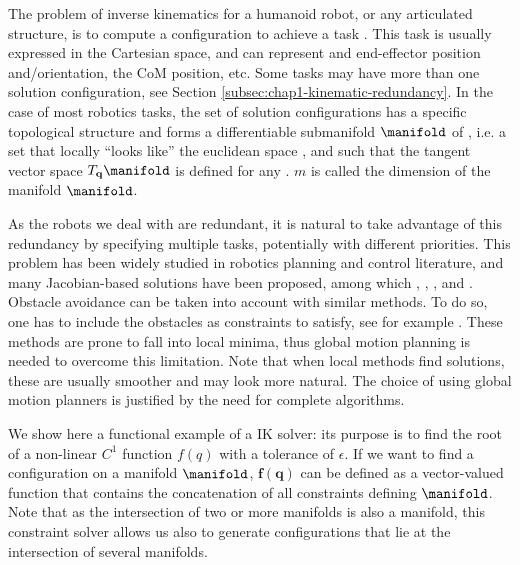 The problem of inverse kinematics for a humanoid robot, or any
articulated structure, is to compute a configuration \config{} to
achieve a task \task{}. This task is usually expressed in the
Cartesian space, and can represent and end-effector position
and/orientation, the CoM position, etc. Some tasks may have more than
one solution configuration, see Section
\ref{subsec:chap1-kinematic-redundancy}. In the case of most robotics
tasks, the set of solution configurations has a specific topological
structure and forms a differentiable submanifold $\manifold$
of \cspace, i.e. a set that locally ``looks like'' the euclidean
space , and such that the tangent vector space
$T_{\mathbf{q}}\manifold$ is defined for any \config{}. $m$ is called the
dimension of the manifold $\manifold$.

As the robots we deal with are redundant, it is natural to take
advantage of this redundancy by specifying multiple tasks, potentially
with different priorities. This problem has been widely studied in
robotics planning and control literature, and many Jacobian-based
solutions have been proposed, among which \cite{nakamura1986iks},
\cite{siciliano1991gfm}, \cite{baerlocher1998tpf},
\cite{khatib2004wbd} and \cite{kano09}. Obstacle avoidance can be
taken into account with similar methods. To do so, one has to include
the obstacles as constraints to satisfy, see for example
\cite{kanehiro2008lca}. These methods are prone to fall into local
minima, thus global motion planning is needed to overcome this
limitation. Note that when local methods find solutions, these are
usually smoother and may look more natural. The choice of using global
motion planners is justified by the need for complete algorithms.

We show here a functional example of a IK solver: its purpose is to
find the root \config{} of a non-linear $C^1$ function $f(q)$ with a
tolerance of $\epsilon$. If we want to find a configuration on a
manifold $\manifold$, $\mathbf{f}(\mathbf{q})$ can be defined as a
vector-valued function that contains the concatenation of all
constraints defining $\manifold$. Note that as the intersection of two
or more manifolds is also a manifold, this constraint solver allows us
also to generate configurations that lie at the intersection of
several manifolds.

